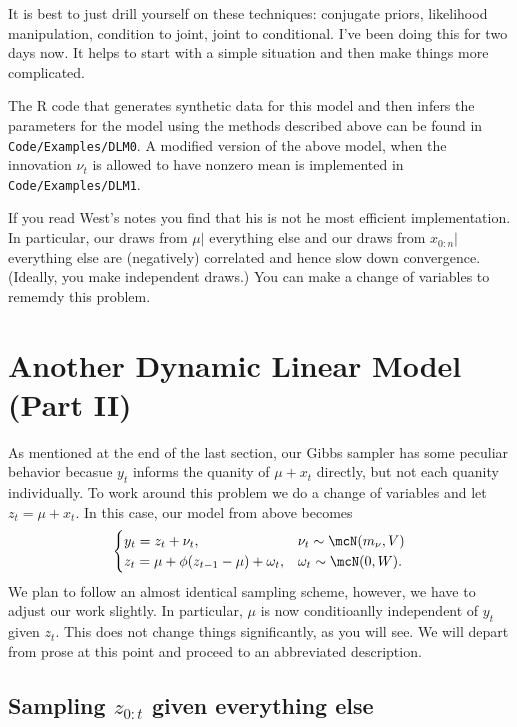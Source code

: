 \documentclass{article}
\begin{document}
\begin{aside}
It is best to just drill yourself on these techniques: conjugate priors, likelihood manipulation, condition to joint, joint to conditional.  I've been doing this for two days now.  It helps to start with a simple situation and then make things more complicated.
\end{aside}

\begin{aside}
The R code that generates synthetic data for this model and then infers the parameters for the model using the methods described above can be found in \texttt{Code/Examples/DLM0}.  A modified version of the above model, when the innovation $\nu_t$ is allowed to have nonzero mean is implemented in \texttt{Code/Examples/DLM1}.
\end{aside}

If you read West's notes you find that his is not he most efficient implementation.  In particular, our draws from $\mu |$ everything else and our draws from $x_{0:n} | $ everything else are (negatively) correlated and hence slow down convergence.  (Ideally, you make independent draws.) You can make a change of variables to rememdy this problem.

\section{Another Dynamic Linear Model (Part II)}

As mentioned at the end of the last section, our Gibbs sampler has some peculiar behavior becasue $y_t$ informs the quanity of $\mu + x_t$ directly, but not each quanity individually.  To work around this problem we do a change of variables and let $z_t = \mu + x_t$.  In this case, our model from above becomes
\[
\begin{cases}
y_t = z_t + \nu_t, & \nu_t \sim \mcN(m_\nu, V) \\
z_t = \mu + \phi (z_{t-1} - \mu) + \omega_t, & \omega_t \sim \mcN(0, W).
\end{cases}
\]
We plan to follow an almost identical sampling scheme, however, we have to adjust our work slightly.  In particular, $\mu$ is now conditioanlly independent of $y_t$ given $z_t$.  This does not change things significantly, as you will see.  We will depart from prose at this point and proceed to an abbreviated description.

\subsection{Sampling  $z_{0:t}$ given everything else}
\end{document}
